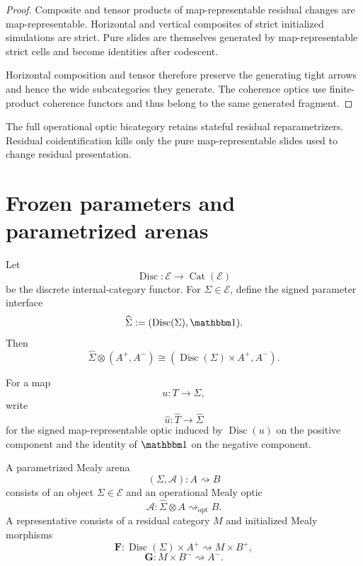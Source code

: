 \begin{proof}
Composite and tensor products of map-representable residual changes are map-representable.
Horizontal and vertical composites of strict initialized simulations are strict. Pure slides are
themselves generated by map-representable strict cells and become identities after codescent.

Horizontal composition and tensor therefore preserve the generating tight arrows and hence the wide
subcategories they generate. The coherence optics use finite-product coherence functors and thus
belong to the same generated fragment.
\end{proof}

The full operational optic bicategory retains stateful residual reparametrizers. Residual
coidentification kills only the pure map-representable slides used to change residual presentation.

\section{Frozen parameters and parametrized arenas}
\label{sec:parametrized-arenas}

Let
\[
  \operatorname{Disc}:\mathcal E\longrightarrow\operatorname{Cat}(\mathcal E)
\]
be the discrete internal-category functor. For \(\Sigma\in\mathcal E\), define the signed parameter
interface
\[
  \widehat\Sigma
  :=
  (\operatorname{Disc}(\Sigma),\mathbbm1).
\]
Then
\[
  \widehat\Sigma\otimes(A^+,A^-)
  \cong
  (\operatorname{Disc}(\Sigma)\times A^+,A^-).
\]

For a map
\[
  u:T\longrightarrow\Sigma,
\]
write
\[
  \widehat u:
  \widehat T\longrightarrow\widehat\Sigma
\]
for the signed map-representable optic induced by
\(\operatorname{Disc}(u)\) on the positive component and the identity of \(\mathbbm1\) on the
negative component.

\begin{definition}
\label{def:parametrized-mealy-arena}
A parametrized Mealy arena
\[
  (\Sigma,\mathcal A):A\rightsquigarrow B
\]
consists of an object \(\Sigma\in\mathcal E\) and an operational Mealy optic
\[
  \mathcal A:
  \widehat\Sigma\otimes A
  \rightsquigarrow_{\mathrm{opt}}
  B.
\]
A representative consists of a residual category \(M\) and initialized Mealy morphisms
\[
  \mathbf F:
  \operatorname{Disc}(\Sigma)\times A^+
  \rightsquigarrow
  M\times B^+,
\]
\[
  \mathbf G:
  M\times B^-
  \rightsquigarrow
  A^-.
\]
\end{definition}

